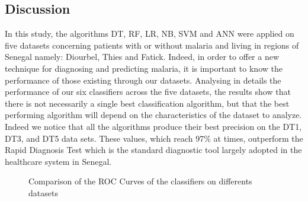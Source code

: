 \subsection{Discussion}

In this study, the algorithms DT, RF, LR, NB, SVM and ANN were applied on five datasets concerning patients with or without malaria and living in regions of Senegal namely: Diourbel, Thies and Fatick. Indeed, in order to offer a new technique for diagnosing and predicting malaria, it is important to know the performance of those existing through our datasets.
Analysing in details the performance of our six classifiers across the five datasets, the results show that there is not necessarily a single best classification algorithm, but that the best performing algorithm will depend on the characteristics of the dataset to analyze. Indeed we notice that all the algorithms produce their best precision on the DT1, DT3, and DT5 data sets. These values, which reach 97\% at times, outperform the Rapid Diagnosis Test which is the standard diagnostic tool largely adopted in the healthcare system in Senegal.
\begin{figure}
\caption{Comparison of the ROC Curves of the classifiers on differents datasets}
\end{figure}

